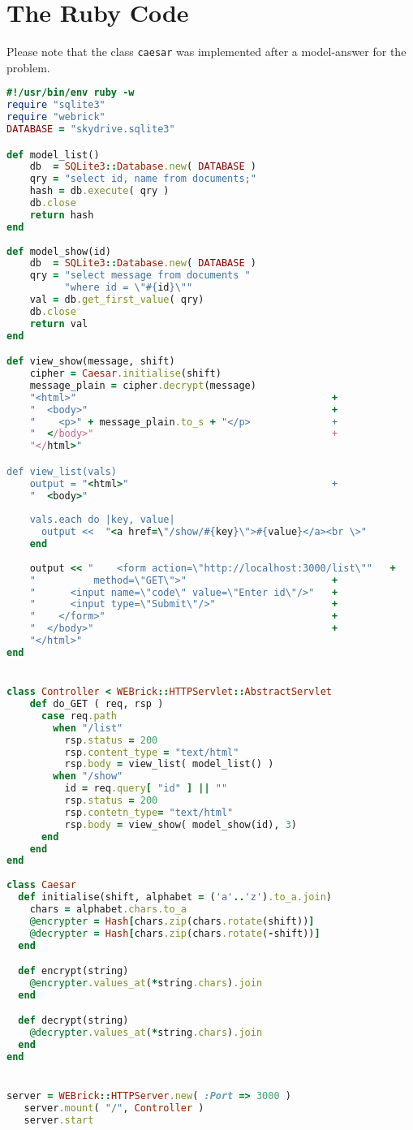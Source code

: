 \documentclass[11pt]{article}
\begin{document}
\section{The Ruby Code}
Please note that the class \texttt{caesar} was implemented after a model-answer for the problem.
\begin{lstlisting}[language=Ruby]
#!/usr/bin/env ruby -w
require "sqlite3"
require "webrick"
DATABASE = "skydrive.sqlite3"

def model_list()
	db  = SQLite3::Database.new( DATABASE )
	qry = "select id, name from documents;"
	hash = db.execute( qry )
	db.close
	return hash
end
	
def model_show(id)
	db  = SQLite3::Database.new( DATABASE )
	qry = "select message from documents "
	      "where id = \"#{id}\""
	val = db.get_first_value( qry)
	db.close
	return val
end

def view_show(message, shift)
    cipher = Caesar.initialise(shift)
    message_plain = cipher.decrypt(message)
    "<html>"                                            +
    "  <body>"                                          +
    "    <p>" + message_plain.to_s + "</p>              +
    "  </body>"                                         +
    "</html>"

def view_list(vals)
	output = "<html>"                                   +
	"  <body>"
	
	vals.each do |key, value|
	  output <<	 "<a href=\"/show/#{key}\">#{value}</a><br \>"
	end
	
	output << "    <form action=\"http://localhost:3000/list\""   +
	"          method=\"GET\">"                         +
	"      <input name=\"code\" value=\"Enter id\"/>"   +
	"      <input type=\"Submit\"/>"                    +
	"    </form>"                                       +
	"  </body>"                                         +
	"</html>"
end


class Controller < WEBrick::HTTPServlet::AbstractServlet
    def do_GET ( req, rsp )
      case req.path
        when "/list"
          rsp.status = 200
          rsp.content_type = "text/html"
          rsp.body = view_list( model_list() )
        when "/show"
          id = req.query[ "id" ] || ""
          rsp.status = 200
          rsp.contetn_type= "text/html"
          rsp.body = view_show( model_show(id), 3)
      end
    end
end
    
class Caesar
  def initialise(shift, alphabet = ('a'..'z').to_a.join)
    chars = alphabet.chars.to_a
    @encrypter = Hash[chars.zip(chars.rotate(shift))]
    @decrypter = Hash[chars.zip(chars.rotate(-shift))]
  end

  def encrypt(string)
    @encrypter.values_at(*string.chars).join
  end

  def decrypt(string)
    @decrypter.values_at(*string.chars).join
  end
end


server = WEBrick::HTTPServer.new( :Port => 3000 )
   server.mount( "/", Controller )
   server.start


\end{lstlisting}
	
\end{document}
